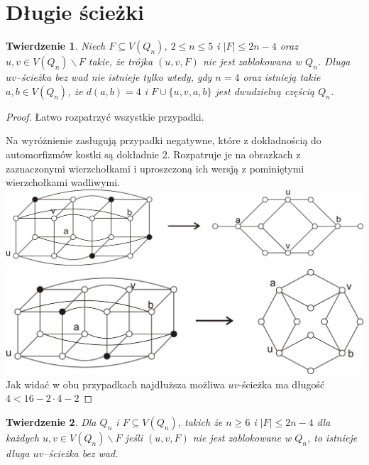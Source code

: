 \documentclass{pracamgr}
\newtheorem{theorem}{Twierdzenie}[chapter]
\begin{document}
  \section{Długie ścieżki}
   \begin{theorem}\label{tw o dlugich sciezkach, male n}
    Niech $F\subseteq V(Q_n)$, $2\le n \le 5$ i $|F|\le 2n-4$ oraz $u,v\in V(Q_n)\backslash F$ takie, że trójka $(u,v,F)$
    nie jest zablokowana w $Q_n$. Długa $uv$--ścieżka bez wad nie istnieje tylko wtedy, gdy $n=4$ oraz istnieją takie $a,b\in V(Q_n)$,
    że $d(a,b)=4$  i $F\cup\{u,v,a,b\}$  jest dwudzielną częścią $Q_n$.
   \end{theorem}
   \begin{proof}
    Łatwo rozpatrzyć wszystkie przypadki.
    
    Na wyróżnienie zasługują przypadki negatywne, które z dokładnością do automorfizmów kostki są dokładnie 2.
    Rozpatruje je na obrazkach z zaznaczonymi wierzchołkami i uproszczoną ich wersją z pominiętymi wierzchołkami wadliwymi.\newline\newline
    \hspace*{100pt}\includegraphics[scale=0.7]{img/Q_4_niezablokowane_1.jpg}\newline
    \hspace*{100pt}\includegraphics[scale=0.7]{img/Q_4_niezablokowane_2.jpg}\newline
    Jak widać w obu przypadkach najdłuższa możliwa $uv$-ścieżka ma długość $4<16-2\cdot4-2$
   \end{proof}
   \begin{theorem}\label{tw o dlugich sciezkach}
    Dla $Q_n$ i $F\subseteq V(Q_n)$, takich  że  $n\ge 6$ i $|F|\le 2n-4$ dla każdych $u,v\in V(Q_n)\backslash F$ jeśli $(u,v,F)$ nie jest zablokowane w $Q_n$,
    to istnieje długa $uv$--ścieżka bez wad.
   \end{theorem}
\end{document}

